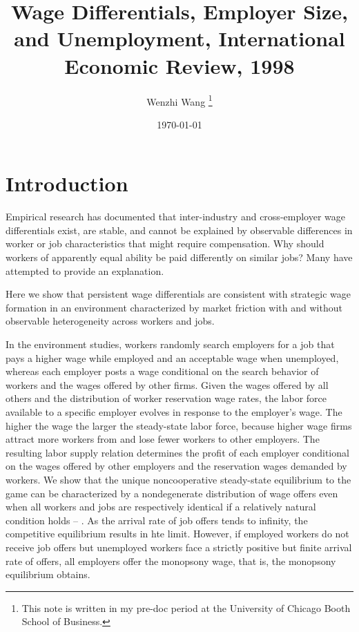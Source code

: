 \documentclass[12pt]{article}
\newcommand{\highlightP}[1]{{\emph{\color{MyPink}{#1}}}}
\theoremstyle{definition}
\begin{document}
 


\title{\bf Wage Differentials, Employer Size, and Unemployment, International Economic Review, 1998} 
\author{Wenzhi Wang \thanks{This note is written in my pre-doc period at the University of Chicago Booth School of Business.} } 
\date{\today} 
\maketitle 

\citet{burdettWageDifferentialsEmployer1998}

\section{Introduction}

Empirical research has documented that inter-industry and cross-employer wage differentials exist, are stable, and cannot be explained by observable differences in worker or job characteristics that might require compensation. Why should workers of apparently equal ability be paid differently on similar jobs? Many have attempted to provide an explanation. 

Here we show that persistent wage differentials are consistent with strategic wage formation in an environment characterized by market friction with and without observable heterogeneity across workers and jobs. 

In the environment studies, workers randomly search employers for a job that pays a higher wage while employed and an acceptable wage when unemployed, whereas each employer posts a wage conditional on the search behavior of workers and the wages offered by other firms. Given the wages offered by all others and the distribution of worker reservation wage rates, the labor force available to a specific employer evolves in response to the employer's wage. The higher the wage the larger the steady-state labor force, because higher wage firms attract more workers from and lose fewer workers to other employers. The resulting labor supply relation determines the profit of each employer conditional on the wages offered by other employers and the reservation wages demanded by workers. We show that the unique noncooperative steady-state equilibrium to the game can be characterized by a nondegenerate distribution of wage offers even when all workers and jobs are respectively identical if a relatively natural condition holds -- \highlightP{the arrival rate of job offers experienced by all workers is strictly positive but finite}. As the arrival rate of job offers tends to infinity, the competitive equilibrium results in hte limit. However, if employed workers do not receive job offers but unemployed workers face a strictly positive but finite arrival rate of offers, all employers offer the monopsony wage, that is, the monopsony equilibrium obtains. 
\end{document}
